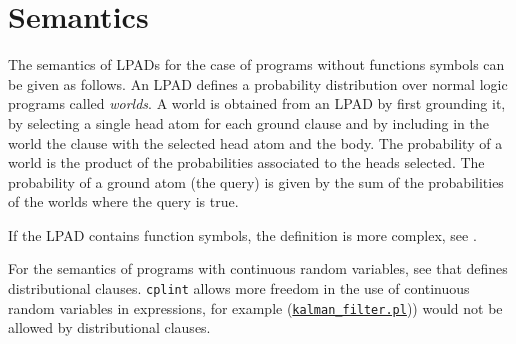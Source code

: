 \section{Semantics}
\label{semantics}

The semantics of LPADs for the case of programs without functions symbols can be given
as follows. An LPAD defines a probability distribution over normal logic programs called
\emph{worlds}. A world is obtained from an LPAD by first grounding it, by 
selecting a single head atom for each ground clause and by including in the world
the clause with the selected head atom and the body.
The probability of a world is the product of the probabilities associated to the 
heads selected.
The probability of a ground atom (the query) is given by the sum of the probabilities
of the worlds where the query is true.

If the LPAD contains function symbols, the definition is more complex, see
\cite{DBLP:journals/ai/Poole97,DBLP:journals/jair/SatoK01,Rig15-PLP-IW}.

For the semantics of programs with continuous random variables, see \cite{Nitti2016} that defines distributional clauses.
\verb|cplint| allows more freedom in the use of continuous random variables
in expressions, for example
(\href{http://cplint.lamping.unife.it/example/inference/kalman_filter.pl}{\texttt{kalman\_filter.pl}})) would not be allowed by distributional clauses.
